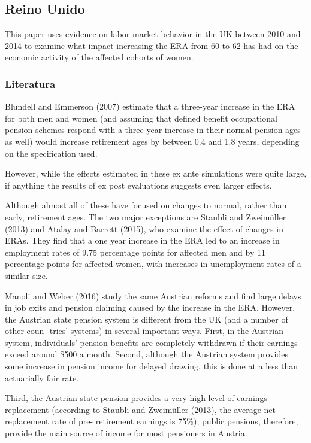 \documentclass[]{article}
\begin{document}
\hypertarget{reino-unido}{%
\subsection{Reino Unido}\label{reino-unido}}

This paper uses evidence on labor market behavior in the UK between 2010
and 2014 to examine what impact increasing the ERA from 60 to 62 has had
on the economic activity of the affected cohorts of women.

\hypertarget{literatura}{%
\subsubsection{Literatura}\label{literatura}}

Blundell and Emmerson (2007) estimate that a three-year increase in the
ERA for both men and women (and assuming that defined benefit
occupational pension schemes respond with a three-year increase in their
normal pension ages as well) would increase retirement ages by between
0.4 and 1.8 years, depending on the specification used.

However, while the effects estimated in these ex ante simulations were
quite large, if anything the results of ex post evaluations suggests
even larger effects.

Although almost all of these have focused on changes to normal, rather
than early, retirement ages. The two major exceptions are Staubli and
Zweimüller (2013) and Atalay and Barrett (2015), who examine the effect
of changes in ERAs. They find that a one year increase in the ERA led to
an increase in employment rates of 9.75 percentage points for affected
men and by 11 percentage points for affected women, with increases in
unemployment rates of a similar size.

Manoli and Weber (2016) study the same Austrian reforms and find large
delays in job exits and pension claiming caused by the increase in the
ERA. However, the Austrian state pension system is different from the UK
(and a number of other coun- tries' systems) in several important ways.
First, in the Austrian system, individuals' pension benefits are
completely withdrawn if their earnings exceed around \$500 a month.
Second, although the Austrian system provides some increase in pension
income for delayed drawing, this is done at a less than actuarially fair
rate.

Third, the Austrian state pension provides a very high level of earnings
replacement (according to Staubli and Zweimüller (2013), the average net
replacement rate of pre- retirement earnings is 75\%); public pensions,
therefore, provide the main source of income for most pensioners in
Austria.
\end{document}
